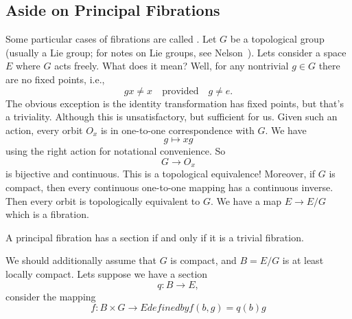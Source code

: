 \subsection{Aside on Principal Fibrations}
Some particular cases of fibrations are called . Let $G$ be 
a topological group (usually a Lie group; for notes on Lie
groups, see Nelson~\cite{nelson2}).  Lets consider a space $E$
where $G$ acts freely. What does it mean? Well, for any nontrivial $g\in G$
there are no fixed points, i.e.,
\begin{equation}
gx\not=x\quad\mbox{provided}\quad g\not=e.
\end{equation}
The obvious exception is the identity transformation has fixed
points, but that's a triviality. Although this is unsatisfactory,
but sufficient for us. Given such an action, every orbit $O_{x}$
is in one-to-one correspondence with $G$. We have
\begin{equation}
g\mapsto xg
\end{equation}
using the right action for notational convenience. So
\begin{equation}
G\to O_{x}
\end{equation}
is bijective and continuous. This is a topological equivalence!
Moreover, if $G$ is compact, then every continuous one-to-one
mapping has a continuous inverse. Then every orbit is
topologically equivalent to $G$. We have a map $E\to E/G$ which
is a fibration.
\begin{thm}
A principal fibration has a section if and only if it is a
trivial fibration.
\end{thm}
We should additionally assume that $G$ is compact, and $B=E/G$ is
at least locally compact.
Lets suppose we have a section 
\begin{equation}
q\colon B\to E, 
\end{equation}
consider the mapping
\begin{subequations}
\begin{equation}
f\colon B\times G\to E
\end{equation}
defined by
\begin{equation}
f(b,g)=q(b)g
\end{equation}
\end{subequations}
